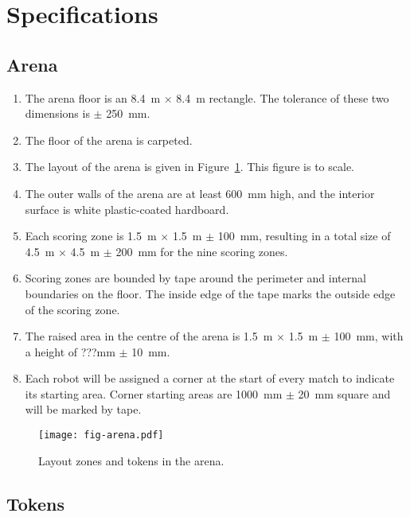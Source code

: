 \section{Specifications}
\label{sec:specs}

\subsection{Arena}
\label{spec:arena}

\begin{enumerate}
  \item The arena floor is an \SI{8.4}{m} $\times$ \SI{8.4}{m} rectangle. The
        tolerance of these two dimensions is $\pm$ \SI{250}{mm}.
  \item The floor of the arena is carpeted.
  \item The layout of the arena is given in Figure~\ref{fig:arena}. This
        figure is to scale.
  \item The outer walls of the arena are at least \SI{600}{mm} high, and the
        interior surface is white plastic-coated hardboard.
  \item Each scoring zone is \SI{1.5}{m} $\times$ \SI{1.5}{m} $\pm$ \SI{100}{mm},
        resulting in a total size of \SI{4.5}{m} $\times$ \SI{4.5}{m} $\pm$ \SI{200}{mm}
        for the nine scoring zones.
  \item Scoring zones are bounded by tape around the perimeter
        and internal boundaries on the floor. The inside edge of the tape marks the outside
        edge of the scoring zone.
  \item The raised area in the centre of the arena is \SI{1.5}{m} $\times$ \SI{1.5}{m} $\pm$ \SI{100}{mm},
        with a height of ???mm $\pm$ \SI{10}{mm}.
  \item Each robot will be assigned a corner at the start of every match to indicate its starting area.
        Corner starting areas are \SI{1000}{mm} $\pm$ \SI{20}{mm} square and will be marked by tape.
\end{enumerate}

\begin{figure}
  \texttt{[image: fig-arena.pdf]}
  \caption{Layout zones and tokens in the arena.}
  \label{fig:arena}
\end{figure}

\subsection{Tokens}
\label{spec:tokens}

